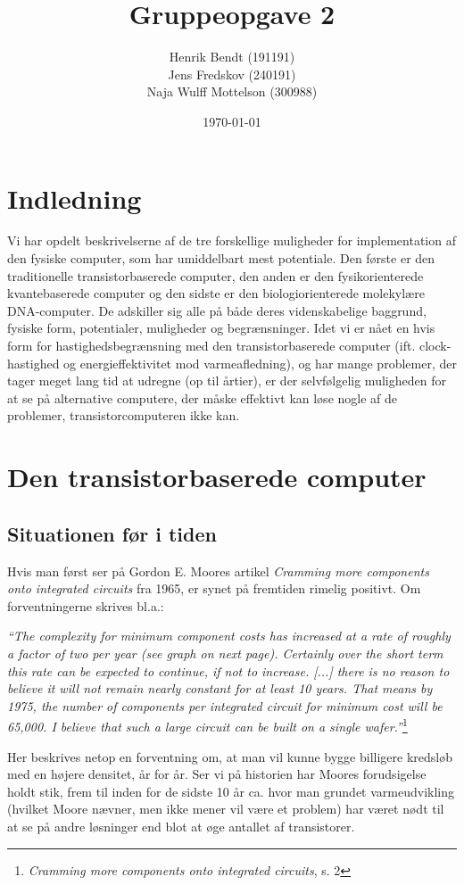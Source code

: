 \documentclass[10pt,a4paper]{article}
\title{Gruppeopgave 2}
\author{Henrik Bendt (191191)\\Jens Fredskov (240191)\\Naja Wulff Mottelson (300988)}
\date{\today}
\newcommand{\citat}[2]{\begin{justify}\textit{``#1''}\hspace{0.1cm}\footnote{#2}\end{justify}}
\begin{document}
\maketitle

\section{Indledning}
Vi har opdelt beskrivelserne af de tre forskellige muligheder for
implementation af den fysiske computer, som har umiddelbart mest potentiale.
Den første er den traditionelle transistorbaserede computer, den anden er den
fysikorienterede kvantebaserede computer og den sidste er den
biologiorienterede molekylære DNA-computer. De adskiller sig alle på både deres
videnskabelige baggrund, fysiske form, potentialer, muligheder og
begrænsninger. Idet vi er nået en hvis form for hastighedsbegrænsning med den
transistorbaserede computer (ift. clock-hastighed og energieffektivitet mod
varmeafledning), og har mange problemer, der tager meget lang tid at udregne (op
til årtier), er der selvfølgelig muligheden for at se på alternative computere,
der måske effektivt kan løse nogle af de problemer, transistorcomputeren ikke
kan.

\section{Den transistorbaserede computer}
\subsection{Situationen før i tiden}
Hvis man først ser på Gordon E. Moores artikel \textit{Cramming more components
onto integrated circuits} fra 1965, er synet på fremtiden rimelig positivt. Om
forventningerne skrives bl.a.: \citat{The complexity for minimum component costs
has increased at a rate of roughly a factor of two per year (see graph on next
page). Certainly over the short term this rate can be expected to continue, if
not to increase. [...] there is no reason to believe it will not remain nearly
constant for at least 10 years. That means by 1975, the number of components per
integrated circuit for minimum cost will be 65,000. I believe that such a large
circuit can be built on a single wafer.}{\textit{Cramming more components onto
integrated circuits}, s. 2}

Her beskrives netop en forventning om, at man vil kunne bygge billigere kredsløb
med en højere densitet, år for år. Ser vi på historien har Moores forudsigelse
holdt stik, frem til inden for de sidste 10 år ca. hvor man grundet
varmeudvikling (hvilket Moore nævner, men ikke mener vil være et problem) har
været nødt til at se på andre løsninger end blot at øge antallet af
transistorer.
\end{document}

